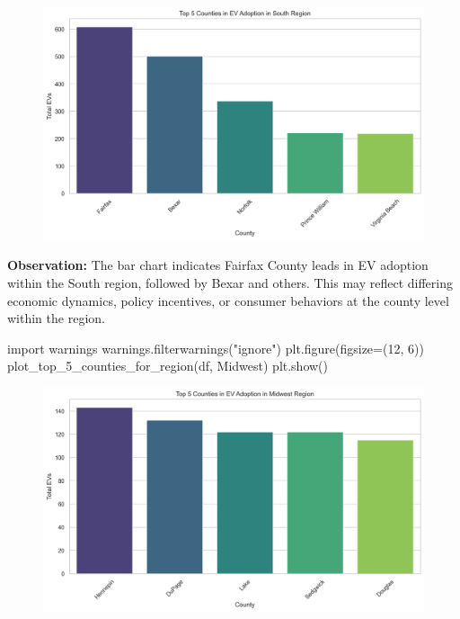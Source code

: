 \documentclass[
  letterpaper,
  DIV=11,
  numbers=noendperiod]{scrartcl}
\newenvironment{Shaded}{\begin{snugshade}}{\end{snugshade}}
\newcommand{\DecValTok}[1]{\textcolor[rgb]{0.68,0.00,0.00}{#1}}
\newcommand{\ImportTok}[1]{\textcolor[rgb]{0.00,0.46,0.62}{#1}}
\newcommand{\NormalTok}[1]{\textcolor[rgb]{0.00,0.23,0.31}{#1}}
\newcommand{\OperatorTok}[1]{\textcolor[rgb]{0.37,0.37,0.37}{#1}}
\newcommand{\StringTok}[1]{\textcolor[rgb]{0.13,0.47,0.30}{#1}}
\begin{document}
\begin{figure}[H]

{\centering \includegraphics{SummaryPaper_FinalProject_T1_files/figure-pdf/cell-12-output-1.png}

}

\end{figure}

\textbf{Observation:} The bar chart indicates Fairfax County leads in EV
adoption within the South region, followed by Bexar and others. This may
reflect differing economic dynamics, policy incentives, or consumer
behaviors at the county level within the region.

\begin{Shaded}
\begin{Highlighting}[]
\ImportTok{import}\NormalTok{ warnings}
\NormalTok{warnings.filterwarnings(}\StringTok{"ignore"}\NormalTok{)}
\NormalTok{plt.figure(figsize}\OperatorTok{=}\NormalTok{(}\DecValTok{12}\NormalTok{, }\DecValTok{6}\NormalTok{))}
\NormalTok{plot\_top\_5\_counties\_for\_region(df, }\StringTok{\textquotesingle{}Midwest\textquotesingle{}}\NormalTok{)}
\NormalTok{plt.show()}
\end{Highlighting}
\end{Shaded}

\begin{figure}[H]

{\centering \includegraphics{SummaryPaper_FinalProject_T1_files/figure-pdf/cell-13-output-1.png}

}

\end{figure}
\end{document}
